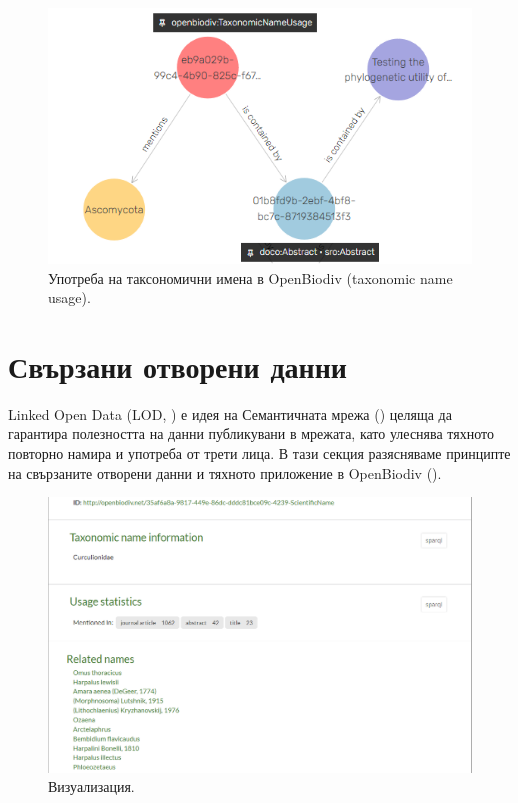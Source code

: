 \begin{figure}
\centering
\includegraphics[width=\textwidth]{Figures/tnu-vis}
\decoRule
\caption[Visual graph of a taxonomic name usage]{Употреба на таксономични имена в OpenBiodiv (taxonomic name usage).}
\label{fig:tnu-vis}
\end{figure}

\section{Свързани отворени данни}

Linked Open Data (LOD, \cite{heath_linked_2011}) е идея на Семантичната мрежа (\cite{berners-lee_semantic_2001}) целяща да гарантира полезността на данни публикувани в мрежата, като улеснява тяхното повторно намира и употреба от трети лица. В тази секция разясняваме принципте на свързаните отворени данни и тяхното приложение в OpenBiodiv (\cite{heath_linked_2011}).

\begin{figure}
\centering
\includegraphics[width=\textwidth]{Figures/portal-name-visualization}
\decoRule
\caption{Визуализация.}
\label{fig:portal-name-visualization}
\end{figure}


